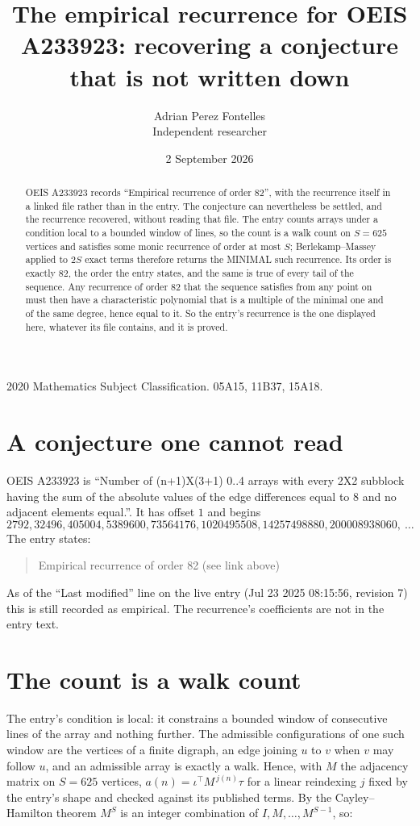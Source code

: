 \documentclass[11pt,a4paper]{article}
\title{The empirical recurrence for OEIS A233923: recovering a conjecture that is not written down}
\author{Adrian Perez Fontelles\\ \small Independent researcher}
\date{2 September 2026}
\theoremstyle{plain}
\theoremstyle{definition}
\begin{document}
\maketitle

\begin{abstract}
OEIS A233923 records ``Empirical recurrence of order $82$'', with the recurrence itself in a
linked file rather than in the entry. The conjecture can nevertheless be settled, and the
recurrence recovered, without reading that file. The entry counts arrays under a condition
local to a bounded window of lines, so the count is a walk count on $S=625$ vertices and
satisfies some monic recurrence of order at most $S$; Berlekamp--Massey applied to $2S$ exact
terms therefore returns the MINIMAL such recurrence. Its order is exactly $82$, the order
the entry states, and the same is true of every tail of the sequence. Any recurrence of order
$82$ that the sequence satisfies from any point on must then have a characteristic
polynomial that is a multiple of the minimal one and of the same degree, hence equal to it. So
the entry's recurrence is the one displayed here, whatever its file contains, and it is
proved.
\end{abstract}

\noindent\small 2020 Mathematics Subject Classification. 05A15, 11B37, 15A18.\normalsize

\section{A conjecture one cannot read}

OEIS A233923 is ``Number of (n+1)X(3+1) 0..4 arrays with every 2X2 subblock having the sum of the absolute values of the edge differences equal to 8 and no adjacent elements equal.''. It has offset $1$ and begins
\[
2792, 32496, 405004, 5389600, 73564176, 1020495508, 14257498880, 200008938060,\ \dots
\]
The entry states:
\begin{quote}
Empirical recurrence of order 82 (see link above)
\end{quote}
As of the ``Last modified'' line on the live entry (Jul 23 2025 08:15:56, revision 7) this is still
recorded as empirical. The recurrence's coefficients are not in the entry text.

\section{The count is a walk count}

The entry's condition is local: it constrains a bounded window of consecutive lines of the
array and nothing further. The admissible configurations of one such window are the vertices
of a finite digraph, an edge joining $u$ to $v$ when $v$ may follow $u$, and an admissible
array is exactly a walk. Hence, with $M$ the adjacency matrix on $S=625$ vertices,
$a(n)=\iota^{\!\top}M^{\,j(n)}\tau$ for a linear reindexing $j$ fixed by the entry's shape
and checked against its published terms. By the Cayley--Hamilton theorem $M^{S}$ is an
integer combination of $I,M,\dots,M^{S-1}$, so:
\end{document}
